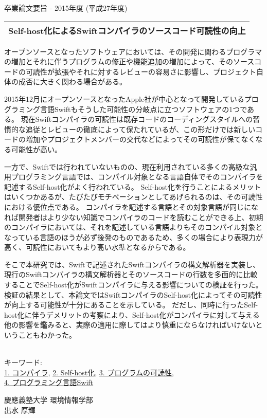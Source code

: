 卒業論文要旨 - 2015年度 (平成27年度)
\begin{center}
\begin{Large}
\begin{tabular}{|c|} \hline
Self-host化によるSwiftコンパイラのソースコード可読性の向上
\\ \hline
\end{tabular}
\end{Large}
\end{center}

オープンソースとなったソフトウェアにおいては、その開発に関わるプログラマの増加とそれに伴うプログラムの修正や機能追加の増加によって、そのソースコードの可読性が拡張やそれに対するレビューの容易さに影響し、プロジェクト自体の成否に大きく関わる場合がある。

2015年12月にオープンソースとなったApple社が中心となって開発しているプログラミング言語Swiftもそうした可能性の分岐点に立つソフトウェアの1つである。
現在Swiftコンパイラの可読性は既存コードのコーディングスタイルへの習慣的な追従とレビューの徹底によって保たれているが、この形だけでは新しいコードの増加やプロジェクトメンバーの交代などによってその可読性が保てなくなる可能性が高い。

一方で、Swiftでは行われていないものの、現在利用されている多くの高級な汎用プログラミング言語では、コンパイル対象となる言語自体でそのコンパイラを記述するSelf-host化がよく行われている。
Self-host化を行うことによるメリットはいくつかあるが、たびたびモチベーションとしてあげられるのは、その可読性における優位点である。
コンパイラを記述する言語とその対象言語が同じになれば開発者はより少ない知識でコンパイラのコードを読むことができる上、初期のコンパイラにおいては、それを記述している言語よりもそのコンパイル対象となっている言語のほうが必ず後発のものであるため、多くの場合により表現力が高く、可読性においてもより高い水準となるからである。

そこで本研究では、Swiftで記述されたSwiftコンパイラの構文解析器を実装し、現行のSwiftコンパイラの構文解析器とそのソースコードの行数を多面的に比較することでSelf-host化がSwiftコンパイラに与える影響についての検証を行った。
検証の結果として、本論文ではSwiftコンパイラのSelf-host化によってその可読性が向上する可能性が十分にあることを示している。
だだし、同時に行ったSelf-host化に伴うデメリットの考察により、Self-host化がコンパイラに対して与える他の影響を鑑みると、実際の適用に際してはより慎重にならなければいけないということもわかった。

~ \\
キーワード:\\
\underline{1. コンパイラ},
\underline{2. Self-host化},
\underline{3. プログラムの可読性},\\
\underline{4. プログラミング言語Swift}
\begin{flushright}
慶應義塾大学 環境情報学部\\
出水 厚輝
\end{flushright}
